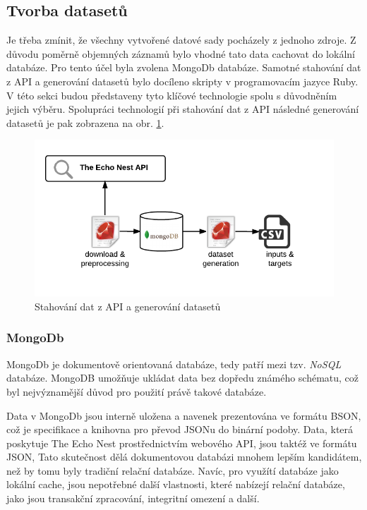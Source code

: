 \documentclass[thesis=M,czech]{FITthesis}[2012/06/26]
\begin{document}
\subsection{Tvorba datasetů}

Je třeba zmínit, že všechny vytvořené datové sady pocházely z jednoho zdroje. Z důvodu poměrně objemných záznamů bylo vhodné tato data cachovat do lokální databáze. Pro tento účel byla zvolena MongoDb databáze. Samotné stahování dat z API a generování datasetů bylo docíleno skripty v programovacím jazyce Ruby. V této sekci budou představeny tyto klíčové technologie spolu s důvodněním jejich výběru. Spolupráci technologií při stahování dat z API následné generování datasetů je pak zobrazena na obr. \ref{fig:down}.

\begin{figure}[htbp]
\begin{center}
	\includegraphics[scale=1]{download_generate.png}
\caption{Stahování dat z API a generování datasetů}
\label{fig:down}
\end{center}
\end{figure}

\subsubsection*{MongoDb}
MongoDb je dokumentově orientovaná databáze, tedy patří mezi tzv. \textit{NoSQL} databáze. MongoDB umožňuje ukládat data bez dopředu známého schématu, což byl nejvýznamější důvod pro použití právě takové databáze.

Data v MongoDb jsou interně uložena a navenek prezentována ve formátu BSON, což je specifikace a knihovna pro převod JSONu do binární podoby. Data, která poskytuje The Echo Nest prostřednictvím webového API, jsou taktéž ve formátu JSON, Tato skutečnost dělá dokumentovou databázi mnohem lepším kandidátem, než by tomu byly tradiční relační databáze. Navíc, pro využítí databáze jako lokální cache, jsou nepotřebné další vlastnosti, které nabízejí relační databáze, jako jsou transakční zpracování, integritní omezení a další.
\end{document}
